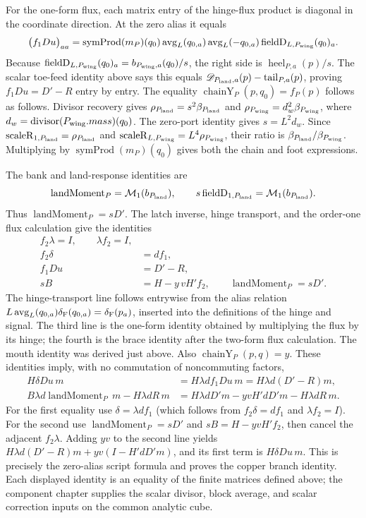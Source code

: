 For the one-form flux, each matrix entry of the hinge-flux product is
diagonal in the coordinate direction. At the zero alias it equals
\[
 \bigl(f_1D u\bigr)_{aa}
 =\operatorname{symProd}(m_P)(q_0)\operatorname{avg}_L(q_{0,a})
   \operatorname{avg}_L(-q_{0,a})
   \operatorname{fieldD}_{L,P_{\rm wing}}(q_0)_a.
\]
Because $\operatorname{fieldD}_{L,P_{\rm wing}}(q_0)_a=
b_{P_{\rm wing},a}(q_0)/s$,
the right side is $\operatorname{heel}_{P,a}(p)/s$. The scalar toe-feed
identity above says this equals
$\mathscr D_{P_{\rm land},a}(p)-\operatorname{tail}_{P,a}(p)$, proving
$f_1D u=D'-R$ entry by entry. The equality
$\operatorname{chainY}_P(p,q_0)=f_P(p)$ follows as
follows. Divisor recovery gives
$\rho_{P_{\rm land}}=s^2\beta_{P_{\rm land}}$ and
$\rho_{P_{\rm wing}}=d_w^2\beta_{P_{\rm wing}}$, where
$d_w=\operatorname{divisor}(P_{\rm wing}.mass)(q_0)$. The zero-port
identity gives $s=L^2d_w$. Since
$\operatorname{scaleR}_{1,P_{\rm land}}=\rho_{P_{\rm land}}$ and
$\operatorname{scaleR}_{L,P_{\rm wing}}=L^4\rho_{P_{\rm wing}}$,
their ratio is $\beta_{P_{\rm land}}/\beta_{P_{\rm wing}}$. Multiplying by
$\operatorname{symProd}(m_P)(q_0)$ gives both the chain and foot expressions.

The bank and land-response identities are
\[
 \operatorname{landMoment}_P=\mathcal M_1(b_{P_{\rm land}}),\qquad
 s\operatorname{fieldD}_{1,P_{\rm land}}=\mathcal M_1(b_{P_{\rm land}}).
\]
Thus $\operatorname{landMoment}_P=sD'$.
The latch inverse, hinge transport, and the order-one flux calculation give
the identities
\begin{align*}
 f_2\lambda=I,\qquad \lambda f_2=I,\\
 f_2\delta&=d f_1,\\
 f_1D u&=D'-R,\\
sB&=H-y\,vH'f_2,\qquad \operatorname{landMoment}_P=sD'.
\end{align*}
The hinge-transport line follows entrywise from the alias relation
$L\operatorname{avg}_L(q_{0,a})\delta_{\rm F}(q_{0,a})
=\delta_{\rm F}(p_a)$, inserted into the definitions of the hinge and
signal. The third line is the one-form identity obtained by
multiplying the flux by its hinge; the fourth is the brace identity after
the two-form flux calculation. The mouth identity was derived just above.
Also $\operatorname{chainY}_P(p,q)=y$. These identities imply, with no
commutation of noncommuting factors,
\begin{align*}
 H\delta D u\,m
   &=H\lambda d f_1D u\,m
     =H\lambda d(D'-R)m,\\
 B\lambda d\operatorname{landMoment}_P\,m-H\lambda dR\,m
   &=H\lambda dD'm-yvH'dD'm-H\lambda dR\,m.
\end{align*}
For the first equality use $\delta=\lambda d f_1$ (which follows from
$f_2\delta=df_1$ and $\lambda f_2=I$). For the second use
$\operatorname{landMoment}_P=sD'$ and $sB=H-yvH'f_2$, then cancel the adjacent
$f_2\lambda$. Adding $yv$ to the second line yields
$H\lambda d(D'-R)m+yv(I-H'dD'm)$, and its first term is
$H\delta D u\,m$. This is precisely the zero-alias script formula and
proves the copper branch identity. Each displayed identity is an equality
of the finite matrices defined above; the component chapter supplies the
scalar divisor, block average, and scalar correction inputs on the common analytic cube.

